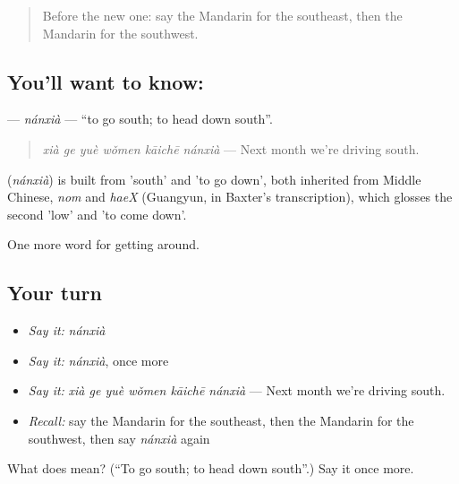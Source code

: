 \label{lesson:ZH-C423-nanxia}



\begin{quote}
Before the new one: say the Mandarin for the southeast, then the Mandarin for the southwest.
\end{quote}

\subsection*{You'll want to know: }
\textbf{} — \emph{nánxià} — \textquotedblleft{}to go south; to head down south\textquotedblright{}.

\begin{quote}
\textbf{} \emph{xià ge yuè wǒmen kāichē nánxià} — Next month we're driving south.
\end{quote}

\begin{cousinweb}
\textbf{} (\emph{nánxià}) is built from  'south' and  'to go down', both inherited from Middle Chinese, \emph{nom} and \emph{haeX} (Guangyun, in Baxter's transcription), which glosses the second 'low' and 'to come down'.
\end{cousinweb}

\begin{grammarlens}[title={What you've built}]
One more word for getting around.
\end{grammarlens}

\subsection*{Your turn}
\begin{itemize}
\raggedright
  \item \emph{Say it:} \emph{nánxià}
  \item \emph{Say it:} \emph{nánxià}, once more
  \item \emph{Say it:} \emph{xià ge yuè wǒmen kāichē nánxià} — Next month we're driving south.
  \item \emph{Recall:} say the Mandarin for the southeast, then the Mandarin for the southwest, then say \emph{nánxià} again
\end{itemize}

\begin{tcolorbox}[breakable,colback=teal!4,colframe=teal!35!black,title={Before you move on}]
What does  mean? (\textquotedblleft{}To go south; to head down south\textquotedblright{}.) Say it once more.
\end{tcolorbox}
